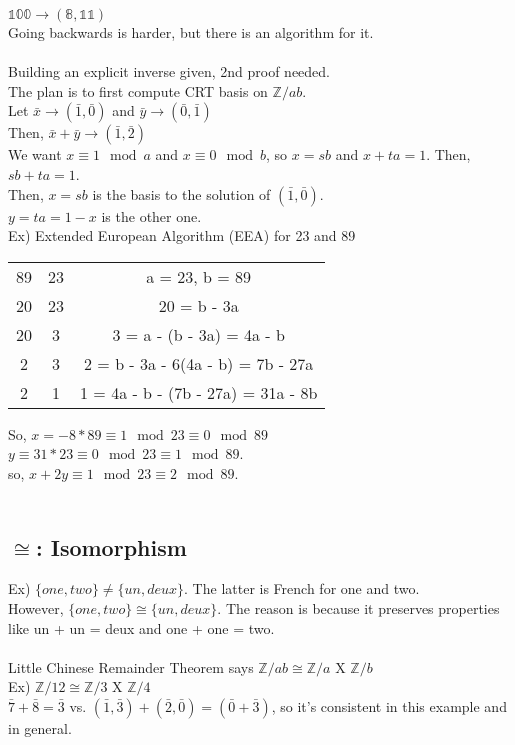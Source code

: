\documentclass[13pt]{article}
\begin{document}
		$\mathbb{100} \rightarrow (\mathbb{8}, \mathbb{11})$\\
		Going backwards is harder, but there is an algorithm for it.\\\\
		Building an explicit inverse given, 2nd proof needed.\\
		The plan is to first compute CRT basis on $\mathbb{Z}/ab$.\\
		Let $\bar{x} \rightarrow (\bar{1}, \bar{0})$ and $\bar{y} 
		\rightarrow (\bar{0}, \bar{1})$\\
		Then, $\bar{x} + \bar{y} \rightarrow (\bar{1}, \bar{2})$\\
		We want $x \equiv 1 \mod a$ and $x \equiv 0 \mod b$, so
		$x = sb$ and $x + ta = 1$. Then, $sb + ta = 1$. \\
		Then, $x = sb$ is the basis to the solution of $(\bar{1}, \bar{0})$.\\
		$y = ta = 1 -x$ is the other one.\\
		Ex) Extended European Algorithm (EEA) for 23 and 89\
		\begin{tabular}{c | c || c}
			89 & 23 & a = 23, b = 89\\
			20 & 23 & 20 = b - 3a \\
			20 & 3 & 3 = a - (b - 3a) = 4a - b\\
			2 & 3 & 2 = b - 3a - 6(4a - b) = 7b - 27a\\
			2 & 1 & 1 = 4a - b - (7b - 27a) = 31a - 8b\\
		\end{tabular}
		So, $x = -8 * 89 \equiv 1 \mod 23 \equiv 0 \mod 89$\\
		$y \equiv 31 * 23 \equiv 0 \mod 23 \equiv 1 \mod 89$.\\
		so, $x + 2y \equiv 1 \mod 23 \equiv 2 \mod 89$.\\\\

	\subsection*{$\cong$: Isomorphism}
	Ex) $\{one, two\} \not= \{un, deux\}$. The latter is French for one and 
	two.\\
	However, $\{one, two \} \cong \{un, deux\}$. The reason is because it
	preserves properties like un + un = deux and one + one = two.\\\\
	Little Chinese Remainder Theorem says $\mathbb{Z}/ab \cong \mathbb{Z}/a$ 
	X $\mathbb{Z}/b$\\
	Ex) $\mathbb{Z}/12 \cong \mathbb{Z}/3$ X $\mathbb{Z}/4$\\
	$\bar{7} + \bar{8} = \bar{3}$ vs. $(\bar{1}, \bar{3}) + (\bar{2}, \bar{0})
	= (\bar{0} + \bar{3})$, so it's consistent in this example and in general.
	\\
\end{document}
